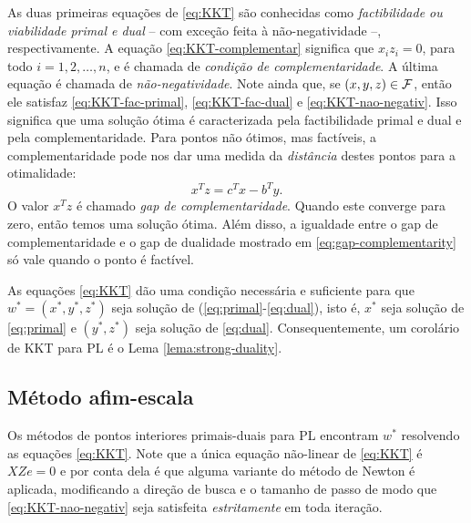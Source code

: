  As duas primeiras
equações de \eqref{eq:KKT} são conhecidas como \emph{factibilidade ou
viabilidade primal e dual} -- com exceção feita à não-negatividade  --,
respectivamente.
A equação \eqref{eq:KKT-complementar}
significa que $x_iz_i = 0$, para todo $i=1,2,\ldots,n$, e é chamada de \emph{condição de complementaridade}. A última equação é chamada
de \emph{não-negatividade}. Note ainda que, se $(x,y,z)\in\mathcal{F}$, então ele
satisfaz \eqref{eq:KKT-fac-primal}, \eqref{eq:KKT-fac-dual} e \eqref{eq:KKT-nao-negativ}.
Isso significa que uma solução ótima é caracterizada pela factibilidade primal e
dual e pela complementaridade. Para pontos não ótimos, mas factíveis, a
complementaridade pode nos dar uma medida da \emph{distância} destes pontos para a
otimalidade:
\begin{equation}
\label{eq:gap-complementarity}
x^Tz = c^Tx - b^Ty.
\end{equation}
O valor $x^Tz$ é chamado \emph{gap de complementaridade}. Quando este 
converge para zero, então temos uma solução ótima. Além disso, a igualdade
entre o gap de complementaridade e o gap de dualidade mostrado em
\eqref{eq:gap-complementarity} só vale quando o ponto é factível. 


As equações \eqref{eq:KKT} dão uma condição necessária e suficiente para que
$w^* = (x^*,y^*,z^*)$ seja solução de (\ref{eq:primal}-\ref{eq:dual}), isto é, $x^*$ seja
solução de \eqref{eq:primal} e $(y^*,z^*)$ seja solução de \eqref{eq:dual}. Consequentemente, um
corolário de \ac{KKT} para \ac{PL} é  o Lema \ref{lema:strong-duality}. 


\subsection{Método afim-escala\label{sec:affine-scalling}}

Os métodos de pontos interiores primais-duais para \ac{PL}  encontram
$w^*$ resolvendo as equações \eqref{eq:KKT}. Note que a única equação não-linear de
\eqref{eq:KKT} é $XZe=0$ e por conta dela é que  alguma  variante do
método de Newton é aplicada, modificando a direção de busca e o tamanho de passo de modo que
\eqref{eq:KKT-nao-negativ} seja  satisfeita \emph{estritamente} em toda iteração. 


